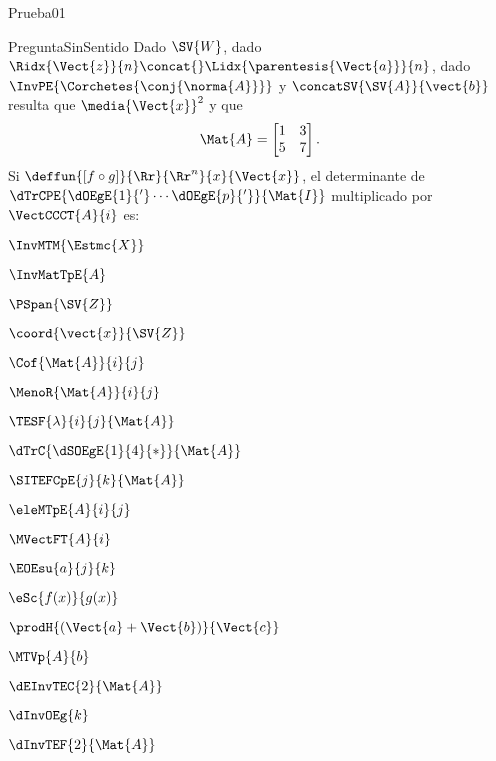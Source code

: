 \documentclass[10pt]{article}
\begin{document}

\begin{quiz}{Prueba01}
  
  \begin{multi}{PreguntaSinSentido}
    Dado $\SV{W}$, dado
    $\Ridx{\Vect{z}}{n}\concat{}\Lidx{\parentesis{\Vect{a}}}{n}$, dado
    $\InvPE{\Corchetes{\conj{\norma{A}}}}$ y
    $\concatSV{\SV{A}}{\vect{b}}$ resulta que $\media{\Vect{x}}^2$ y que
    \[
      \Mat{A}=
      \begin{bmatrix}
        1&3\\
        5&7
      \end{bmatrix}.
    \]
    Si $\deffun{[f \circ g ]}{\Rr}{\Rr^{n}}{x}{\Vect{x}}$, el
    determinante de $\dTrCPE{\dOEgE{1}{'}\cdots\dOEgE{p}{'}}{\Mat{I}}$
    multiplicado por $\VectCCCT{A}{i}$ es:
    \item $\InvMTM{\Estmc{X}}$
    \item $\InvMatTpE{A}$
    \item $\PSpan{\SV{Z}}$
    \item $\coord{\vect{x}}{\SV{Z}}$
    \item $\Cof{\Mat{A}}{i}{j}$
    \item $\MenoR{\Mat{A}}{i}{j}$
    \item $\TESF{\lambda}{i}{j}{\Mat{A}}$
    \item * $\dTrC{\dSOEgE{1}{4}{*}}{\Mat{A}}$
    \item * $\SITEFCpE{j}{k}{\Mat{A}}$
    \item $\eleMTpE{A}{i}{j}$
    \item $\MVectFT{A}{i}$
    \item $\EOEsu{a}{j}{k}$
    \item $\eSc{f(x)}{g(x)}$
    \item $\prodH{(\Vect{a}+\Vect{b})}{\Vect{c}}$
    \item $\MTVp{A}{b}$
    \item $\dEInvTEC{2}{\Mat{A}}$
    \item $\dInvOEg{k}$
    \item $\dInvTEF{2}{\Mat{A}}$

\end{multi}
\end{quiz}
\end{document}
